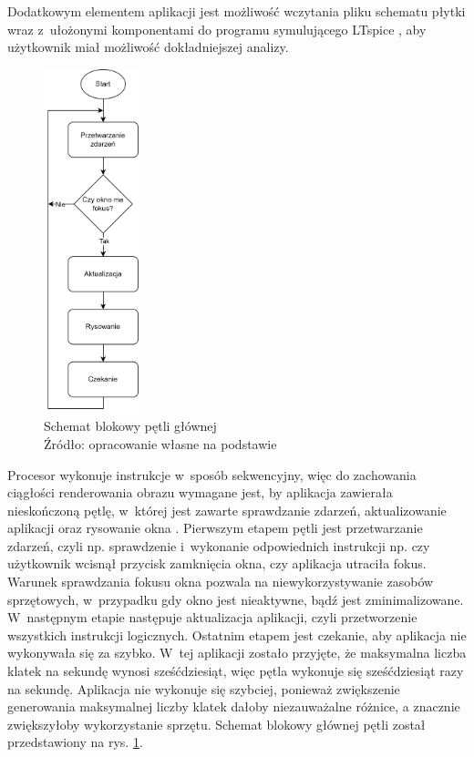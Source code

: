 \documentclass[12pt, a4paper]{article} %
\begin{document}
\noindent\aka Dodatkowym elementem aplikacji jest możliwość wczytania pliku schematu płytki wraz z~ułożonymi komponentami do programu symulującego LTspice \cite{programltspice}, aby użytkownik miał możliwość dokładniejszej analizy. 

\begin{figure}[h]
	\centering
	\includegraphics[height=10cm]{images/main_loop.png}
	\caption{Schemat blokowy pętli głównej \\ Źródło: opracowanie własne na podstawie \cite{gameprogrammingpatterns}}
	\label{rys:main_loop}
\end{figure}


\noindent\aka Procesor wykonuje instrukcje w~sposób sekwencyjny, więc do zachowania ciągłości renderowania obrazu wymagane jest, by aplikacja zawierała nieskończoną pętlę, w~której jest zawarte sprawdzanie zdarzeń, aktualizowanie aplikacji oraz rysowanie okna \cite{gameprogrammingpatterns}. Pierwszym etapem pętli jest przetwarzanie zdarzeń, czyli np. sprawdzenie i~wykonanie odpowiednich instrukcji np. czy użytkownik wcisnął przycisk zamknięcia okna, czy aplikacja utraciła fokus. Warunek sprawdzania fokusu okna pozwala na niewykorzystywanie zasobów sprzętowych, w~przypadku gdy okno jest nieaktywne, bądź jest zminimalizowane. W~następnym etapie następuje aktualizacja aplikacji, czyli przetworzenie wszystkich instrukcji logicznych. Ostatnim etapem jest czekanie, aby aplikacja nie wykonywała się za szybko. W~tej aplikacji zostało przyjęte, że maksymalna liczba klatek na sekundę wynosi sześćdziesiąt, więc pętla wykonuje się sześćdziesiąt razy na sekundę. Aplikacja nie wykonuje się szybciej, ponieważ zwiększenie generowania maksymalnej liczby klatek dałoby niezauważalne różnice, a znacznie zwiększyłoby wykorzystanie sprzętu.  Schemat blokowy głównej pętli został przedstawiony na rys. \ref{rys:main_loop}. 
\end{document}
